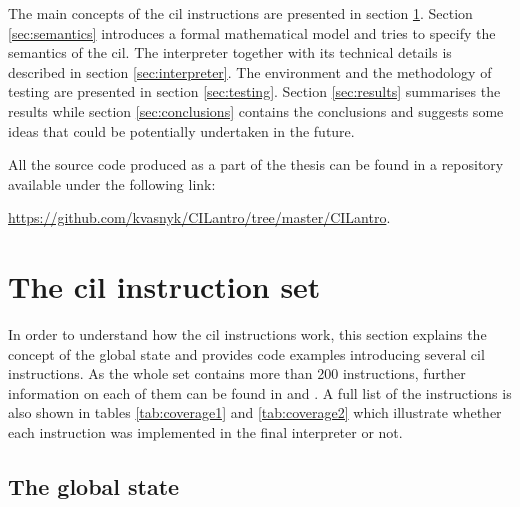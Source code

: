 \documentclass{article}
\numberwithin{equation}{section}
\begin{document}
The main concepts of the \acrshort{cil} instructions are presented in section \ref{sec:instructionSet}. Section \ref{sec:semantics} introduces a formal mathematical model and tries to specify the semantics of the \acrshort{cil}. The interpreter together with its technical details is described in section \ref{sec:interpreter}. The environment and the methodology of testing are presented in section \ref{sec:testing}. Section \ref{sec:results} summarises the results while section \ref{sec:conclusions} contains the conclusions and suggests some ideas that could be potentially undertaken in the future.

All the source code produced as a part of the thesis can be found in a repository available under the following link:
\begin{center}
	\href{https://github.com/kvasnyk/CILantro/tree/master/CILantro}{https://github.com/kvasnyk/CILantro/tree/master/CILantro}.
\end{center}

\clearpage


\section{The \acrshort{cil} instruction set}
\label{sec:instructionSet}

In order to understand how the \acrshort{cil} instructions work, this section explains the concept of the global state and provides code examples introducing several \acrshort{cil} instructions. As the whole set contains more than 200 instructions, further information on each of them can be found in \cite{ecmaStandard} and \cite{isoStandard}. A full list of the instructions is also shown in tables \ref{tab:coverage1} and \ref{tab:coverage2} which illustrate whether each instruction was implemented in the final interpreter or not.

\subsection{The global state}
\label{sec:global_state}
\end{document}
